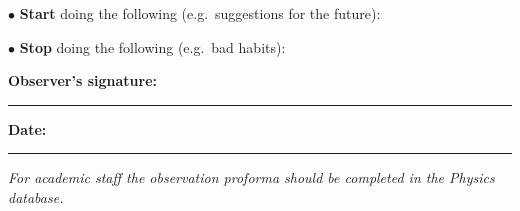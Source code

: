 \documentclass[11pt,a4paper]{article}
\begin{document}
\vspace{3.5\baselineskip}

\noindent$\bullet$ \textbf{Start} doing the following (e.g.\ suggestions for the future):

\vspace{3.5\baselineskip}

\noindent$\bullet$ \textbf{Stop} doing the following (e.g.\ bad habits):

\vspace{3.5\baselineskip}

\vfill

\noindent
\textbf{Observer's signature:} \rule{0.35\textwidth}{0.4pt}\hfill
\textbf{Date:} \rule{0.2\textwidth}{0.4pt}

\vspace{1em}

\noindent\footnotesize\textit{For academic staff the observation proforma should be completed in the Physics database.}
\end{document}
